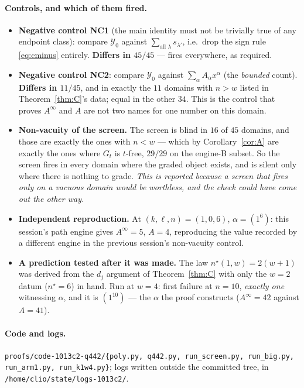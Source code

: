 \documentclass[11pt]{article}
\theoremstyle{plain}
\theoremstyle{definition}
\begin{document}
\paragraph{Controls, and which of them fired.}
\begin{itemize}
\item \textbf{Negative control NC1} (the main identity must not be trivially true of any
  endpoint class): compare $\mathcal Y_0$ against $\sum_{\text{all }\lambda}s_{\lambda'}$,
  i.e.\ drop the sign rule \eqref{eq:cminus} entirely.  \textbf{Differs in $45/45$} ---
  fires everywhere, as required.
\item \textbf{Negative control NC2}: compare $\mathcal Y_0$ against
  $\sum_\alpha A_\alpha x^\alpha$ (the \emph{bounded} count).  \textbf{Differs in $11/45$},
  and in exactly the $11$ domains with $n>w$ listed in Theorem~\ref{thm:C}'s data; equal in
  the other $34$.  This is the control that proves $A^\infty$ and $A$ are not two names for
  one number on this domain.
\item \textbf{Non-vacuity of the screen.}  The screen is blind in $16$ of $45$ domains, and
  those are exactly the ones with $n<w$ --- which by Corollary~\ref{cor:A} are exactly the
  ones where $G_t$ is $t$-free, $29/29$ on the engine-B subset.  So the screen fires in
  every domain where the graded object exists, and is silent only where there is nothing to
  grade.  \emph{This is reported because a screen that fires only on a vacuous domain would
  be worthless, and the check could have come out the other way.}
\item \textbf{Independent reproduction.}  At $(k,\ell,n)=(1,0,6)$, $\alpha=(1^6)$: this
  session's path engine gives $A^\infty=5$, $A=4$, reproducing the value recorded by a
  different engine in the previous session's non-vacuity control.
\item \textbf{A prediction tested after it was made.}  The law $n^\star(1,w)=2(w+1)$ was
  derived from the $d_j$ argument of Theorem~\ref{thm:C} with only the $w=2$ datum
  ($n^\star=6$) in hand.  Run at $w=4$: first failure at $n=10$, \emph{exactly one}
  witnessing $\alpha$, and it is $(1^{10})$ --- the $\alpha$ the proof constructs
  ($A^\infty=42$ against $A=41$).
\end{itemize}

\paragraph{Code and logs.}  \texttt{proofs/code-1013c2-q442/\{poly.py, q442.py, run\_screen.py,
run\_big.py, run\_arm1.py, run\_k1w4.py\}}; logs written outside the committed tree, in
\texttt{/home/clio/state/logs-1013c2/}.
\end{document}

